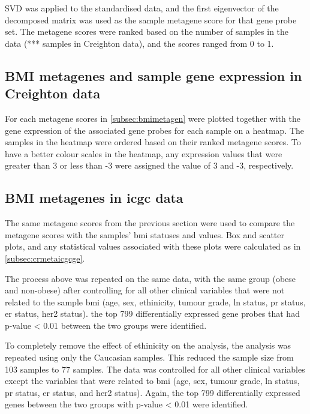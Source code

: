 SVD was applied to the standardised data, and the first eigenvector of the decomposed matrix was used as the sample metagene score for that gene probe set.
The \gls{metagene} scores were ranked based on the number of samples in the data (*** samples in Creighton data), and the scores ranged from 0 to 1.

\subsection{BMI metagenes and sample gene expression in Creighton data}
\label{subsec:gpconv}

For each \gls{metagene} scores in \cref{subsec:bmimetagen} were plotted together with the gene expression of the associated gene probes for each sample on a heatmap.
The samples in the heatmap were ordered based on their ranked \gls{metagene} scores.
To have a better colour scales in the heatmap, any expression values that were greater than 3 or less than -3 were assigned the value of 3 and -3, respectively.

\subsection{BMI metagenes in \gls{icgc} data}
\label{subsec:bmidegmetaicgc}

The same \gls{metagene} scores from the previous section were used to compare the \gls{metagene} scores with the samples' \gls{bmi} statuses and values.
Box and scatter plots, and any statistical values associated with these plots were calculated as in \cref{subsec:crmetaicgcge}.

\newpage



The process above was repeated on the same data, with the same group (obese and non-obese) after controlling for all other clinical variables that were not related to the sample \gls{bmi} (age, sex, ethinicity, tumour grade, \gls{ln} status, \gls{pr} status, \gls{er} status, \gls{her2} status).
the top 799 differentially expressed gene probes that had p-value \textless{} 0.01 between the two groups were identified.

To completely remove the effect of ethinicity on the analysis, the analysis was repeated using only the Caucasian samples.
This reduced the sample size from 103 samples to 77 samples.
The data was controlled for all other clinical variables except the variables that were related to \gls{bmi} (age, sex, tumour grade, \gls{ln} status, \gls{pr} status, \gls{er} status, and \gls{her2} status).
Again, the top 799 differentially expressed genes between the two groups with p-value \textless{} 0.01 were identified.

